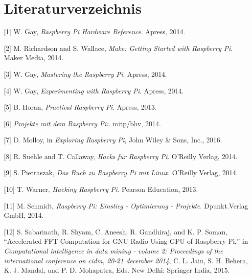 \documentclass[11pt,ngerman,toc=listof,index=totoc]{scrreprt}
\begin{document}
\chapter*{Literaturverzeichnis}\label{literaturverzeichnis}

\hypertarget{refs}{}
\hypertarget{ref-gay2014raspberry}{}
{[}1{]} W. Gay, \emph{Raspberry Pi Hardware Reference}. Apress, 2014.

\hypertarget{ref-richardson2014make}{}
{[}2{]} M. Richardson and S. Wallace, \emph{Make: Getting Started with
Raspberry Pi}. Maker Media, 2014.

\hypertarget{ref-gay2014mastering}{}
{[}3{]} W. Gay, \emph{Mastering the Raspberry Pi}. Apress, 2014.

\hypertarget{ref-gay2014experimenting}{}
{[}4{]} W. Gay, \emph{Experimenting with Raspberry Pi}. Apress, 2014.

\hypertarget{ref-horan2013practical}{}
{[}5{]} B. Horan, \emph{Practical Raspberry Pi}. Apress, 2013.

\hypertarget{ref-2014projekte}{}
{[}6{]} \emph{Projekte mit dem Raspberry Pi:}. mitp/bhv, 2014.

\hypertarget{ref-exploring}{}
{[}7{]} D. Molloy, in \emph{Exploring Raspberry Pi}, John Wiley \& Sons,
Inc., 2016.

\hypertarget{ref-suehle2014hacks}{}
{[}8{]} R. Suehle and T. Callaway, \emph{Hacks für Raspberry Pi}.
O'Reilly Verlag, 2014.

\hypertarget{ref-pietraszak2014buch}{}
{[}9{]} S. Pietraszak, \emph{Das Buch zu Raspberry Pi mit Linux}.
O'Reilly Verlag, 2014.

\hypertarget{ref-warner2013hacking}{}
{[}10{]} T. Warner, \emph{Hacking Raspberry Pi}. Pearson Education,
2013.

\hypertarget{ref-schmidt2014raspberry}{}
{[}11{]} M. Schmidt, \emph{Raspberry Pi: Einstieg - Optimierung -
Projekte}. Dpunkt.Verlag GmbH, 2014.

\hypertarget{ref-Sabarinath2015}{}
{[}12{]} S. Sabarinath, R. Shyam, C. Aneesh, R. Gandhiraj, and K. P.
Soman, ``Accelerated FFT Computation for GNU Radio Using GPU of
Raspberry Pi,'' in \emph{Computational intelligence in data mining -
volume 2: Proceedings of the international conference on cidm, 20-21
december 2014}, C. L. Jain, S. H. Behera, K. J. Mandal, and P. D.
Mohapatra, Eds. New Delhi: Springer India, 2015.
\end{document}
